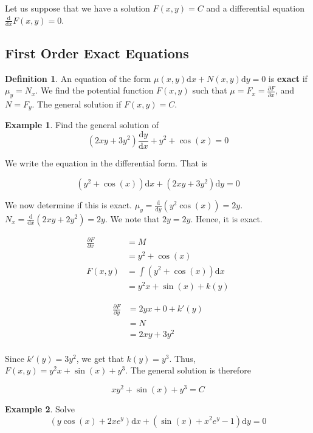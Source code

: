 \documentclass[11pt]{article}
\theoremstyle{plain} %
\theoremstyle{definition}
\newtheorem*{definition}{Definition} %
\theoremstyle{example}
\newtheorem*{example}{Example}
\theoremstyle{remark}
\begin{document}
Let us suppose that we have a solution $F(x,y) = C$ and a differential equation $\frac{\mathrm d}{\mathrm d x}F(x,y) = 0$. 

\subsection{First Order Exact Equations}

\begin{definition}
An equation of the form $\mu(x,y)\mathrm d x + N(x,y)\mathrm d y = 0$ is \textbf{exact} if $\mu_y = N_x$. We find the potential function $F(x,y)$ such that $\mu=F_x = \frac{\partial F}{\partial x}$, and $N = F_y$. The general solution if $F(x,y) = C$. 
\end{definition}

\begin{example}
Find the general solution of $$\left(2xy + 3y^2\right)\frac{\mathrm d y}{\mathrm d x} + y^2 + \cos(x) = 0$$
\end{example}

We write the equation in the differential form. That is

$$\left(y^2 + \cos(x)\right) \mathrm d x + \left(2xy + 3y^2\right) \mathrm d y = 0$$

We now determine if this is exact. $\mu_y = \frac{\mathrm d}{\mathrm d y}\left(y^2 \cos(x)\right) = 2y$. $N_x = \frac{\mathrm d }{\mathrm d x}\left(2xy + 2y^2\right) = 2y$. We note that $2y = 2y$. Hence, it is exact. 

\begin{align*}
\frac{\partial F}{\partial x} &= M \\
	&= y^2+\cos(x)\\
	F(x,y) &= \int \left(y^2 + \cos(x)\right) \mathrm d x\\
	&= y^2x + \sin(x) + k(y)
\end{align*}

\begin{align*}
\frac{\partial F}{\partial y} &= 2yx+ 0 + k'(y)\\
	&= N \\
	&= 2xy + 3y^2\\
\end{align*}

Since $k'(y) = 3y^2$, we get that $k(y) = y^3$. Thus, $F(x,y) = y^2x + \sin(x) + y^3$. The general solution is therefore

$$xy^2 + \sin(x) + y^3  = C$$

\begin{example}
Solve $$\left(y\cos(x) + 2xe^y\right)\mathrm d x + \left(\sin(x) + x^2e^y-1\right) \mathrm d y = 0$$
\end{example}
\end{document}
